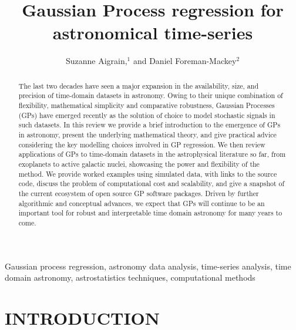 \documentclass[letterpaper]{ar-1col}
\begin{document}

\title{Gaussian Process regression for astronomical time-series}

\author{Suzanne Aigrain,$^1$ and Daniel Foreman-Mackey$^2$
  }

\begin{abstract}
The last two decades have seen a major expansion in the availability, size, and precision of time-domain datasets in astronomy. Owing to their unique combination of flexibility, mathematical simplicity and comparative robustness, Gaussian Processes (GPs) have emerged recently as the solution of choice to model stochastic signals in such datasets. In this review we provide a brief introduction to the emergence of GPs in astronomy, present the underlying mathematical theory, and give practical advice considering the key modelling choices involved in GP regression. We then review applications of GPs to time-domain datasets in the astrophysical literature so far, from exoplanets to active galactic nuclei, showcasing the power and flexibility of the method. We provide worked examples using simulated data, with links to the source code, discuss the problem of computational cost and scalability, and give a snapshot of the current ecosystem of open source GP software packages.
Driven by further algorithmic and conceptual advances, we expect that GPs will continue to be an important tool for robust and interpretable time domain astronomy for many years to come.
\end{abstract}

\begin{keywords}
  Gaussian process regression, astronomy data analysis, time-series analysis, time domain astronomy, astrostatistics techniques, computational methods

\end{keywords}
\maketitle

\tableofcontents

\section{INTRODUCTION}
\label{sec:intro}
\end{document}
